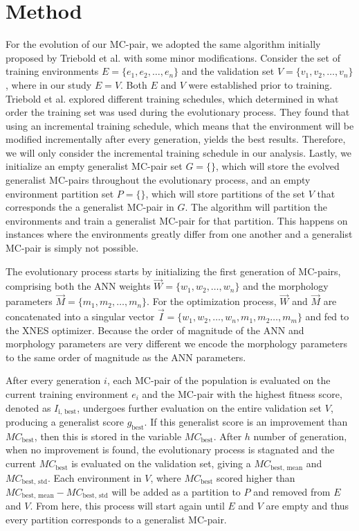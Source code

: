 \section{Method}
    For the evolution of our MC-pair, we adopted the same algorithm initially proposed by Triebold et al. \cite{Corinna_Triebold} with some minor modifications. Consider the set of training environments $E = \{e_1, e_2, \ldots, e_n\}$ and the validation set $V = \{v_1, v_2, \ldots, v_n\}$, where in our study $E = V$. Both $E$ and $V$ were established prior to training. Triebold et al. explored different training schedules, which determined in what order the training set was used during the evolutionary process. They found that using an incremental training schedule, which means that the environment will be modified incrementally after every generation, yields the best results. Therefore, we will only consider the incremental training schedule in our analysis. Lastly, we initialize an empty generalist MC-pair set $G = \{\}$, which will store the evolved generalist MC-pairs throughout the evolutionary process, and an empty environment partition set $P = \{\}$, which will store partitions of the set $V$ that corresponds the a generalist MC-pair in $G$. The algorithm will partition the environments and train a generalist MC-pair for that partition. This happens on instances where the environments greatly differ from one another and a generalist MC-pair is simply not possible. 

    The evolutionary process starts by initializing the first generation of MC-pairs, comprising both the ANN weights $\overrightarrow{W} = \{w_1, w_2, \ldots, w_n\}$ and the morphology parameters $\overrightarrow{M} = \{m_1, m_2, \ldots, m_n\}$. For the optimization process, $\overrightarrow{W}$ and $\overrightarrow{M}$ are concatenated into a singular vector $\overrightarrow{I} = \{w_1, w_2, \ldots, w_n, m_1, m_2 \ldots, m_m\}$ and fed to the XNES optimizer. Because the order of magnitude of the ANN and morphology parameters are very different we encode the morphology parameters to the same order of magnitude as the ANN parameters.

    After every generation $i$, each MC-pair of the population is evaluated on the current training environment $e_i$ and the MC-pair with the highest fitness score, denoted as $I_{\text{i, best}}$, undergoes further evaluation on the entire validation set $V$, producing a generalist score $g_{\text{best}}$. If this generalist score is an improvement than $MC_{\text{best}}$, then this is stored in the variable $MC_{\text{best}}$. After $h$ number of generation, when no improvement is found, the evolutionary process is stagnated and the current $MC_{\text{best}}$ is evaluated on the validation set, giving a $MC_{\text{best, mean}}$ and $MC_{\text{best, std}}$. Each environment in $V$, where $MC_{\text{best}}$ scored higher than $MC_{\text{best, mean}} - MC_{\text{best, std}}$ will be added as a partition to $P$ and removed from $E$ and $V$. From here, this process will start again until $E$ and $V$ are empty and thus every partition corresponds to a generalist MC-pair. 

